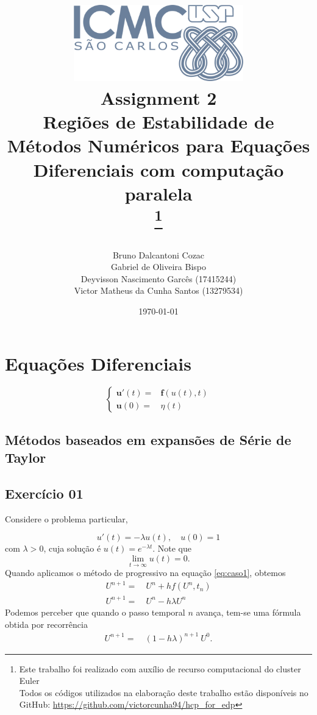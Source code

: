 \documentclass[a4paper,12pt]{article}
\title{
    \vspace{2cm} %
    \includegraphics[width=0.55\textwidth]{Figuras/logo_icmc.png} \\ %
    \vspace{1cm} %
    \textbf{\Huge Assignment 2} \\
    \vspace{1cm} %
    \large Regiões de Estabilidade de Métodos Numéricos para Equações Diferenciais com computação paralela \\
    \vspace{0.5cm}\thanks{Este trabalho foi realizado com auxílio de recurso computacional do cluster Euler\\Todos os códigos utilizados na elaboração deste trabalho estão disponíveis no GitHub: \url{https://github.com/victorcunha94/hcp_for_edp}}
    
}
\author{Bruno Dalcantoni Cozac \\
        Gabriel de Oliveira Bispo \\
        Deyvisson Nascimento Garcês (17415244) \\
        Victor Matheus da Cunha Santos (13279534) }
\date{\today}
\begin{document}
\maketitle
\thispagestyle{empty}
\newpage

\tableofcontents
\newpage

\section{Equações Diferenciais}

\begin{equation*}
    \left\{
\begin{array}{cc}
     \mathbf{u}'(t) = & \mathbf{f}(u(t),t)\\
     \mathbf{u}(0) = & \eta(t) 
\end{array}
    \right.
\end{equation*}

\subsection{Métodos baseados em expansões de Série de Taylor}



\subsection{Exercício 01}
Considere o problema particular, 

\begin{equation*}\label{eq:caso1}
    u'(t) = -\lambda u(t), \quad u(0) = 1
\end{equation*}
com $\lambda > 0$, cuja solução é $u(t) = e^{-\lambda t} $. Note que
\begin{equation*}
    \lim_{t\to\infty} u(t) = 0.
\end{equation*}
Quando aplicamos o método de progressivo na equação \eqref{eq:caso1}, obtemos
\begin{align*}
    U^{n + 1} = & ~ U^{n} + h f(U^{n},t_{n}) \\
    U^{n + 1} = & ~ U^{n} - h \lambda U^{n} 
\end{align*}
Podemos perceber que quando o passo temporal $n$ avança, tem-se uma fórmula obtida por recorrência
\begin{align*}
      U^{n + 1}  = & ~ (1 - h\lambda)^{n+1} ~ U^{0}.
\end{align*}
\end{document}
